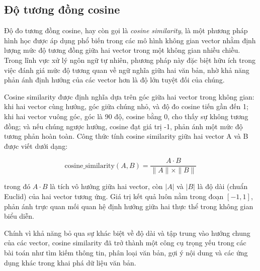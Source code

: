 \subsection{Độ tương đồng cosine}
Độ đo tương đồng cosine, hay còn gọi là \textit{cosine similarity}, là một phương pháp hình học được áp dụng phổ biến trong các mô hình không gian vector nhằm định lượng mức độ tương đồng giữa hai vector trong một không gian nhiều chiều. Trong lĩnh vực xử lý ngôn ngữ tự nhiên, phương pháp này đặc biệt hữu ích trong việc đánh giá mức độ tương quan về ngữ nghĩa giữa hai văn bản, nhờ khả năng phản ánh định hướng của các vector hơn là độ lớn tuyệt đối của chúng.

Cosine similarity được định nghĩa dựa trên góc giữa hai vector trong không gian: khi hai vector cùng hướng, góc giữa chúng nhỏ, và độ đo cosine tiến gần đến 1; khi hai vector vuông góc, góc là 90 độ, cosine bằng 0, cho thấy sự không tương đồng; và nếu chúng ngược hướng, cosine đạt giá trị -1, phản ánh một mức độ tương phản hoàn toàn. Công thức tính cosine similarity giữa hai vector A và B được viết dưới dạng:

\begin{equation}
\text{cosine\_similarity}(A, B) = \frac{A \cdot B}{\|A\| \times \|B\|}
\end{equation}

trong đó \(A \cdot B\) là tích vô hướng giữa hai vector, còn \(|A|\) và \(|B|\) là độ dài (chuẩn Euclid) của hai vector tương ứng. Giá trị kết quả luôn nằm trong đoạn \([-1, 1]\), phản ánh trực quan mối quan hệ định hướng giữa hai thực thể trong không gian biểu diễn.

Chính vì khả năng bỏ qua sự khác biệt về độ dài và tập trung vào hướng chung của các vector, cosine similarity đã trở thành một công cụ trọng yếu trong các bài toán như tìm kiếm thông tin, phân loại văn bản, gợi ý nội dung và các ứng dụng khác trong khai phá dữ liệu văn bản.
